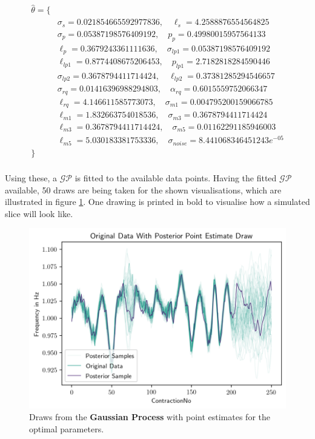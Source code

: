 \documentclass[11pt]{scrartcl}
\begin{document}
\begin{equation}
	\begin{split}
		\hat{\theta} = \{ & \\
		& \sigma_s = 0.021854665592977836, \quad \ell_s = 4.2588876554564825 \\
		& \sigma_p = 0.05387198576409192, \quad p_p = 0.49980015957564133 \\
		& \ell_p = 0.3679243361111636, \quad \sigma_{lp1} = 0.05387198576409192 \\
		& \ell_{lp1} = 0.8774408675206453, \quad p_{lp1} = 2.7182818284590446 \\
		& \sigma_{lp2} = 0.3678794411714424, \quad \ell_{lp2} = 0.37381285294546657 \\
		& \sigma_{rq} = 0.01416396988294803, \quad \alpha_{rq} = 0.6015559752066347 \\
		& \ell_{rq} = 4.146611585773073, \quad \sigma_{m1} = 0.004795200159066785 \\
		& \ell_{m1} = 1.832663754018536, \quad \sigma_{m3} = 0.3678794411714424 \\
		& \ell_{m3} = 0.3678794411714424, \quad \sigma_{m5} = 0.01162291185946003 \\
		& \ell_{m5} = 5.030183381753336, \quad \sigma_{noise} = 8.441068346451243 e^{-05} \\
		\} & \\
	\end{split}
\end{equation}

Using these, a $\mathcal{GP}$ is fitted to the available data points. Having the fitted $\mathcal{GP}$ available, 50 draws are being taken for the shown visualisations, which are illustrated in figure \ref{fig:gp_data_example_posterior_gradient_descent}. One drawing is printed in bold to visualise how a simulated slice will look like.

\begin{figure}[hbt]
	\center
	\includegraphics[width=1.0\textwidth]{img/gp/gp_data_example_posterior_gradient_descent.png}
	\caption{Draws from the \textcolor{viridis5}{\textbf{Gaussian Process}} with point estimates for the optimal parameters.}
	\label{fig:gp_data_example_posterior_gradient_descent}
\end{figure}
\end{document}
